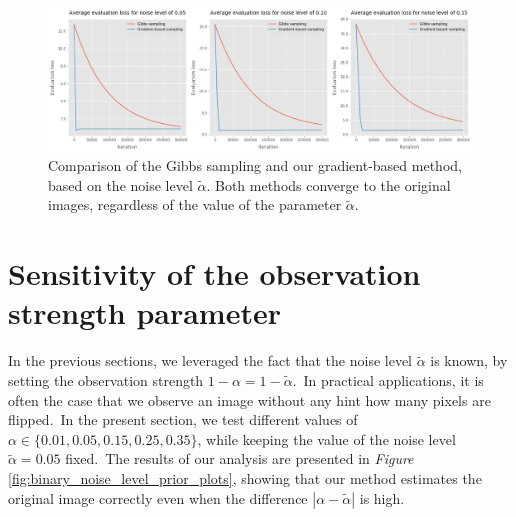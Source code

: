 \documentclass[a4paper, 11pt, onecolumn, openany, titlepage]{report}
\theoremstyle{default_theorem_style}\newtheorem{theorem}{Theorem}
\theoremstyle{default_theorem_style}\newtheorem{definition}{Definition}
\begin{document}
\begin{figure}[H]
\centering
\includegraphics[scale=0.35]{binary_noise_level_plots}
\caption{Comparison of the Gibbs sampling and our gradient-based method, based on the noise level
$\tilde{\alpha}$. Both methods converge to the original images, regardless of the value of
the parameter $\tilde{\alpha}$.}
\label{fig:binary_noise_level_plots}
\end{figure}


\section{Sensitivity of the observation strength parameter}

In the previous sections, we leveraged the fact that the noise level $\tilde{\alpha}$ is known, by setting
the observation strength $1 - \alpha = 1 - \tilde{\alpha}$.\ In practical applications, it is often the case that
we observe an image without any hint how many pixels are flipped.\ In the present section,
we test different values of $\alpha \in \{0.01, 0.05, 0.15, 0.25, 0.35\}$, while keeping the value of the
noise level $\tilde{\alpha} = 0.05$ fixed.\ The results of our analysis are presented in
\textit{Figure} \ref{fig:binary_noise_level_prior_plots}, showing that our method estimates the original
image correctly even when the difference $|\alpha - \tilde{\alpha}|$ is high.
\end{document}
